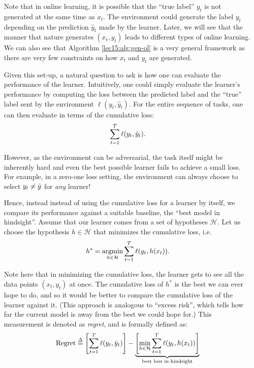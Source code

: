 Note that in online learning, it is possible that the ``true label'' $y_t$ is not generated at the same time as $x_t$. The environment could generate the label $y_t$ depending on the prediction $\hat{y}_t$ made by the learner. Later, we will see that the manner that nature generates  $(x_t, y_t)$ leads to different types of online learning. We can also see that Algorithm \ref{lec15:alg:gen-ol} is a very general framework as there are very few constraints on how $x_t$ and $y_t$ are generated.
    
Given this set-up, a natural question to ask is how one can evaluate the performance of the learner. Intuitively, one could simply evaluate the learner's performance by computing the loss between the predicted label and the ``true'' label sent by the environment $\ell(y_t, \hat{y}_t)$. For the entire sequence of tasks, one can then evaluate in terms of the cumulative loss:
    \begin{align}
        \sum_{t=1}^T \ell(y_t, \hat{y}_t).
    \end{align}
    
However, as the environment can be adversarial, the task itself might be inherently hard and even the best possible learner fails to achieve a small loss. For example, in a zero-one loss setting, the environment can always choose to select $y_t \neq \hat{y}$ for \textit{any} learner!

Hence, instead instead of using the cumulative loss for a learner by itself, we compare its performance against a suitable baseline, the ``best model in hindsight''. Assume that our learner comes from a set of hypotheses $\mathcal{H}$. Let us choose the hypothesis $h \in \mathcal{H}$ that minimizes the cumulative loss, i.e.
\begin{equation}
    h^* = \operatorname*{\textup{argmin}}_{h \in \mathcal{H}} \sum_{t=1}^T \ell(y_t, h(x_t)).
\end{equation}

Note here that in minimizing the cumulative loss, the learner gets to see all the data points $(x_t, y_t)$ at once. The cumulative loss of $h^*$ is the best we can ever hope to do, and so it would be better to compare the cumulative loss of the learner against it. (This approach is analogous to ``excess risk'', which tells how far the current model is away from the best we could hope for.) This measurement is denoted as \emph{regret}, and is formally defined as:
    \begin{align}
        \text{Regret} \overset{\Delta}{=} 
        \left[\sum_{t=1}^T \ell(y_t, \hat{y}_t)\right]
        - \underbrace{
        \left[\min_{h \in \mathcal{H}} \sum_{t=1}^T \ell(y_t, h(x_t))\right]
        }_{\text{best loss in hindsight}}
    \end{align}


